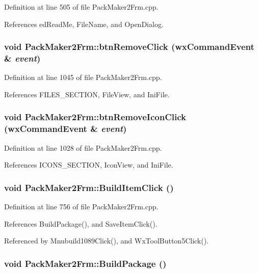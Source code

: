 Definition at line 505 of file Pack\-Maker2Frm.cpp.

References ed\-Read\-Me, File\-Name, and Open\-Dialog.
\subsubsection{\setlength{\rightskip}{0pt plus 5cm}void Pack\-Maker2Frm::btn\-Remove\-Click (wx\-Command\-Event \& {\em event})}\label{class_pack_maker2_frm_3c2d7958fd88ac54ffeb15b9cfe234c8}




Definition at line 1045 of file Pack\-Maker2Frm.cpp.

References FILES\_\-SECTION, File\-View, and Ini\-File.
\subsubsection{\setlength{\rightskip}{0pt plus 5cm}void Pack\-Maker2Frm::btn\-Remove\-Icon\-Click (wx\-Command\-Event \& {\em event})}\label{class_pack_maker2_frm_f8c7c816678a619049d985d59bbcf435}




Definition at line 1028 of file Pack\-Maker2Frm.cpp.

References ICONS\_\-SECTION, Icon\-View, and Ini\-File.
\subsubsection{\setlength{\rightskip}{0pt plus 5cm}void Pack\-Maker2Frm::Build\-Item\-Click ()}\label{class_pack_maker2_frm_b9cd93f3e61b155a81cc7722dbede09a}




Definition at line 756 of file Pack\-Maker2Frm.cpp.

References Build\-Package(), and Save\-Item\-Click().

Referenced by Mnubuild1089Click(), and Wx\-Tool\-Button5Click().
\subsubsection{\setlength{\rightskip}{0pt plus 5cm}void Pack\-Maker2Frm::Build\-Package ()}\label{class_pack_maker2_frm_4d0ab7a3e5ca98ded16f194be39b2588}




